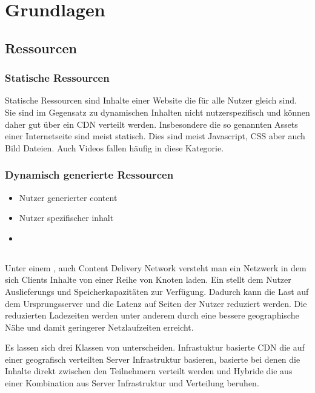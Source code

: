 \chapter{Grundlagen}\label{ch:related_work}

\section{Ressourcen}
\subsection{Statische Ressourcen}
Statische Ressourcen sind Inhalte einer Website die für alle Nutzer gleich sind. Sie sind im Gegensatz zu dynamischen Inhalten nicht nutzerspezifisch und können daher gut über ein CDN verteilt werden. Insbesondere die so genannten Assets einer Internetseite sind meist statisch. Dies sind meist Javascript, CSS aber auch Bild Dateien. Auch Videos fallen häufig in diese Kategorie.

\subsection{Dynamisch generierte Ressourcen}
\begin{itemize}
	\item Nutzer generierter content
	\item Nutzer spezifischer inhalt
	\item 
\end{itemize}

\section{\cdn}
Unter einem \cdn, auch Content Delivery Network versteht man ein Netzwerk in dem sich Clients Inhalte von einer Reihe von Knoten laden. Ein \cdn stellt dem Nutzer Auslieferungs und Speicherkapazitäten zur Verfügung. Dadurch kann die Last auf dem Ursprungsserver und die Latenz auf Seiten der Nutzer reduziert werden. Die reduzierten Ladezeiten werden unter anderem durch eine bessere geographische Nähe und damit geringerer Netzlaufzeiten erreicht. %

Es lassen sich drei Klassen von \cdns unterscheiden. Infrastuktur basierte CDN die auf einer geografisch verteilten Server Infrastruktur basieren, \pTp basierte \cdns bei denen die Inhalte direkt zwischen den Teilnehmern verteilt werden und Hybride \cdns die aus einer Kombination aus Server Infrastruktur und \pTp Verteilung beruhen.

